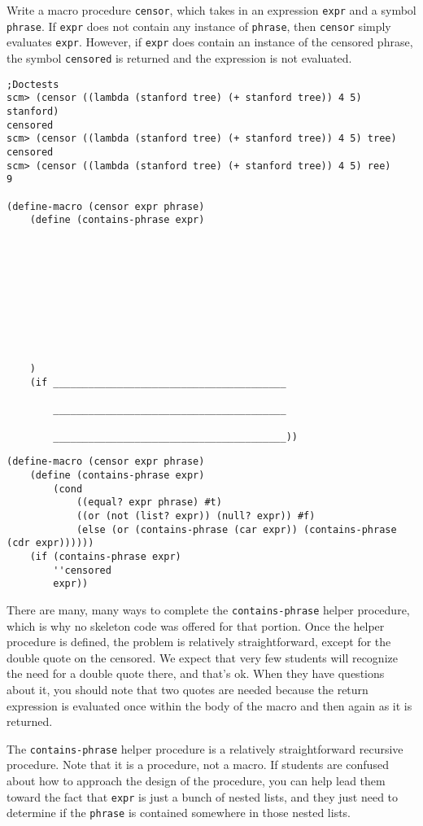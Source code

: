 \begin{blocksection}
\question Write a macro procedure \lstinline{censor}, which takes in an expression \lstinline{expr} and a symbol \lstinline{phrase}. If \lstinline{expr} does not contain any instance of \lstinline{phrase}, then \lstinline{censor} simply evaluates \lstinline{expr}. However, if \lstinline{expr} does contain an instance of the censored phrase, the symbol \lstinline{censored} is returned and the expression is not evaluated.

\begin{lstlisting}
;Doctests
scm> (censor ((lambda (stanford tree) (+ stanford tree)) 4 5) stanford)
censored
scm> (censor ((lambda (stanford tree) (+ stanford tree)) 4 5) tree)
censored
scm> (censor ((lambda (stanford tree) (+ stanford tree)) 4 5) ree)
9

(define-macro (censor expr phrase)
    (define (contains-phrase expr)
    
    
    
    
    




    
    )
    (if ________________________________________

        ________________________________________

        ________________________________________))
\end{lstlisting}

\begin{solution}
\begin{lstlisting}
(define-macro (censor expr phrase)
    (define (contains-phrase expr)
        (cond 
            ((equal? expr phrase) #t)
            ((or (not (list? expr)) (null? expr)) #f)
            (else (or (contains-phrase (car expr)) (contains-phrase (cdr expr))))))
    (if (contains-phrase expr)
        ''censored
        expr))
\end{lstlisting}
\end{solution}
\end{blocksection}

\begin{questionmeta}
    There are many, many ways to complete the \lstinline{contains-phrase} helper procedure, which is why no skeleton code was offered for that portion. Once the helper procedure is defined, the problem is relatively straightforward, except for the double quote on the censored. We expect that very few students will recognize the need for a double quote there, and that's ok. When they have questions about it, you should note that two quotes are needed because the return expression is evaluated once within the body of the macro and then again as it is returned. 
    
    The \lstinline{contains-phrase} helper procedure is a relatively straightforward recursive procedure. Note that it is a procedure, not a macro. If students are confused about how to approach the design of the procedure, you can help lead them toward the fact that \lstinline{expr} is just a bunch of nested lists, and they just need to determine if the \lstinline{phrase} is contained somewhere in those nested lists. 
    \end{questionmeta}